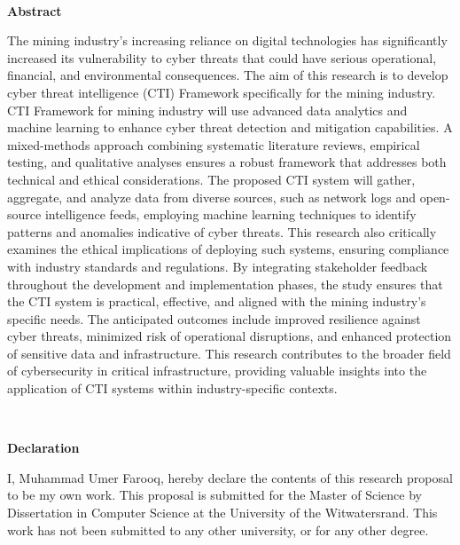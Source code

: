 \documentclass[a4paper,twoside,12pt]{report}
\renewenvironment{abstract}{\ \vfill\begin{center}\textbf{Abstract}\end{center}\addcontentsline{toc}{section}{Abstract}}{\vfill\vfill\newpage}
\newenvironment{declaration}{\ \vfill\begin{center}\textbf{Declaration}\end{center}\addcontentsline{toc}{section}{Declaration}}{\vfill\vfill\newpage}
\begin{document}
\begin{abstract}
    The mining industry’s increasing reliance on digital technologies has significantly increased its vulnerability to cyber threats that could have serious operational, financial, and environmental consequences. The aim of this research is to develop cyber threat intelligence (CTI) Framework specifically for the mining industry. CTI Framework for mining industry will use advanced data analytics and machine learning to enhance cyber threat detection and mitigation capabilities. A mixed-methods approach combining systematic literature reviews, empirical testing, and qualitative analyses ensures a robust framework that addresses both technical and ethical considerations. The proposed CTI system will gather, aggregate, and analyze data from diverse sources, such as network logs and open-source intelligence feeds, employing machine learning techniques to identify patterns and anomalies indicative of cyber threats. This research also critically examines the ethical implications of deploying such systems, ensuring compliance with industry standards and regulations. By integrating stakeholder feedback throughout the development and implementation phases, the study ensures that the CTI system is practical, effective, and aligned with the mining industry’s specific needs. The anticipated outcomes include improved resilience against cyber threats, minimized risk of operational disruptions, and enhanced protection of sensitive data and infrastructure. This research contributes to the broader field of cybersecurity in critical infrastructure, providing valuable insights into the application of CTI systems within industry-specific contexts.
\end{abstract}

\begin{declaration}
I, Muhammad Umer Farooq, hereby declare the contents of this research proposal to be my own work.
This proposal is submitted for the Master of Science by Dissertation in Computer Science at the University of the Witwatersrand.
This work has not been submitted to any other university, or for any other degree.
\end{declaration}
\end{document}
